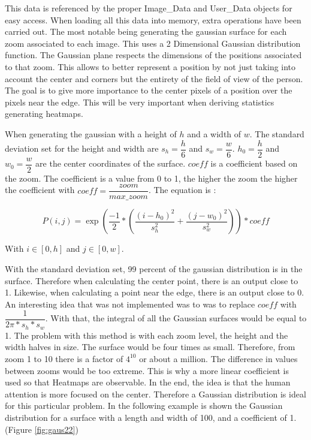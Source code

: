 \documentclass[a4paper,11pt]{report}
\numberwithin{figure}{section} %
\begin{document}
    This data is referenced by the proper Image\_Data and User\_Data objects for easy access.
    When loading all this data into memory, extra operations have been carried out.
    The most notable being generating the gaussian surface for each zoom associated to each image.
    This uses a 2 Dimensional Gaussian distribution function.
    The Gaussian plane respects the dimensions of the positions associated to that zoom.
    This allows to better represent a position by not just taking into account the center and corners but the entirety of the field of view of the person.
    The goal is to give more importance to the center pixels of a position over the pixels near the edge.
    This will be very important when deriving statistics generating heatmaps.

    When generating the gaussian with a height of $h$ and a width of $w$.
    The standard deviation set for the height and width are $s_h = \dfrac{h}{6}$ and $s_w = \dfrac{w}{6}$.
    $h_0 = \dfrac{h}{2}$ and $w_0 = \dfrac{w}{2}$ are the center coordinates of the surface.
    $coeff$ is a coefficient based on the zoom.
    The coefficient is a value from 0 to 1, the higher the zoom the higher the coefficient with $coeff = \dfrac{zoom}{max\_zoom}$.
    The equation is :

        \[P(i,j) = \exp(\dfrac{-1}{2}*(\dfrac{(i - h_0)^2}{s_h^2} + \dfrac{(j - w_0)^2}{s_w^2})) * coeff \]

    With $i \in [0, h]$ and $j \in [0, w]$.

    With the standard deviation set, 99 percent of the gaussian distribution is in the surface.
    Therefore when calculating the center point, there is an output close to 1.
    Likewise, when calculating a point near the edge, there is an output close to 0.
    An interesting idea that was not implemented was to was to replace $coeff$ with $\dfrac{1}{2\pi*s_h*s_w}$.
    With that, the integral of all the Gaussian surfaces would be equal to 1.
    The problem with this method is with each zoom level, the height and the width halves in size.
    The surface would be four times as small.
    Therefore, from zoom 1 to 10 there is a factor of $4^{10}$ or about a million.
    The difference in values between zooms would be too extreme.
    This is why a more linear coefficient is used so that Heatmaps are observable.
    In the end, the idea is that the human attention is more focused on the center.
    Therefore a Gaussian distribution is ideal for this particular problem.
    In the following example is shown the Gaussian distribution for a surface with a length and width of 100, and a coefficient of 1. (Figure \ref{fig:gaus22})
\end{document}
